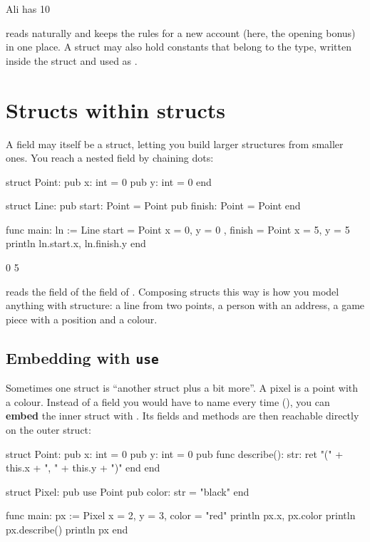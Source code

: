 \begin{progout}
Ali has 10
\end{progout}

 reads naturally and keeps the rules for a new account
(here, the opening bonus) in one place. A struct may also hold constants that
belong to the type, written  inside the struct and
used as .

\section{Structs within structs}

A field may itself be a struct, letting you build larger structures from smaller
ones. You reach a nested field by chaining dots:

\begin{salamen}
struct Point:
    pub x: int = 0
    pub y: int = 0
end

struct Line:
    pub start: Point = Point {}
    pub finish: Point = Point {}
end

func main:
    ln := Line {
        start = Point { x = 0, y = 0 },
        finish = Point { x = 5, y = 5 }
    }
    println ln.start.x, ln.finish.y
end
\end{salamen}

\begin{progout}
0 5
\end{progout}

 reads the  field of the  field of
. Composing structs this way is how you model anything with structure:
a line from two points, a person with an address, a game piece with a position
and a colour.

\subsection{Embedding with \texttt{use}}

Sometimes one struct is ``another struct plus a bit more''. A pixel is a point
with a colour. Instead of a field you would have to name every time
(), you can \textbf{embed} the inner struct with
. Its fields and  methods are then reachable directly on the
outer struct:

\begin{salamen}
struct Point:
    pub x: int = 0
    pub y: int = 0
    pub func describe(): str:
        ret "(" + this.x + ", " + this.y + ")"
    end
end

struct Pixel:
    pub use Point
    pub color: str = "black"
end

func main:
    px := Pixel { x = 2, y = 3, color = "red" }
    println px.x, px.color
    println px.describe()
    println px
end
\end{salamen}

